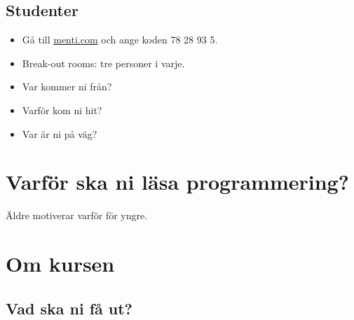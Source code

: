\subsection{Studenter}

\begin{frame}
  \begin{exercise}
    \begin{itemize}
      \item Gå till \url{menti.com} och ange koden 78 28 93 5.
    \end{itemize}
  \end{exercise}
\end{frame}

\begin{frame}
  \begin{exercise}[Vilka är ni?]
    \begin{itemize}
      \item Break-out rooms: tre personer i varje.
      \item Var kommer ni från?
      \item Varför kom ni hit?
      \item Var är ni på väg?
    \end{itemize}
  \end{exercise}
\end{frame}


\section{Varför ska ni läsa programmering?}

\begin{frame}
  \begin{center}
    Äldre motiverar varför för yngre.
  \end{center}
\end{frame}


\section{Om kursen}

\subsection{Vad ska ni få ut?}

